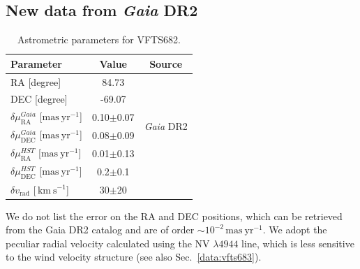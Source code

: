 \documentclass[a4paper,fleqn,usenatbib]{mnras}
\newcommand{\kms}{{\,\mathrm{km\ s^{-1}}}}
\DeclareRobustCommand{\Secref}[1]{Sec.~\ref{#1}}
\begin{document}
\subsection{New data from \emph{Gaia} DR2  \label{data:gaia}}

\begin{table}[t]
  \begin{center}
    \caption{Astrometric parameters for VFTS682. }
    \begin{tabular}{l|c|c}
      \hline
      \hline
      Parameter & Value & Source\\
      \hline
      RA \hfill[degree] &  \phantom{-}84.73 %
                        & \multirow{2}{*}{\cite{evans:11}}\\[5pt]
      DEC \hfill [degree] & -69.07 %
                        & \\[5pt]
      \hline
      $\delta\mu_\mathrm{RA}^{Gaia}$  \hfill[$\mathrm{mas\ yr^{-1}}$] & 0.10$\pm$0.07 & \multirow{2}{*}{\emph{Gaia} DR2}\\[5pt]
      $\delta\mu_\mathrm{DEC}^{Gaia}$  \hfill[$\mathrm{mas\ yr^{-1}}$] & 0.08$\pm$0.09 & \\[5pt]
      \hline
      $\delta\mu_\mathrm{RA}^{HST}$  \hfill[$\mathrm{mas\ yr^{-1}}$] & 0.01$\pm$0.13 & \multirow{2}{*}{\cite{platais:18}}\\[5pt]
      $\delta\mu_\mathrm{DEC}^{HST}$  \hfill[$\mathrm{mas\ yr^{-1}}$] &
                                                                        0.2$\pm$0.1 &
      \\[5pt]
      \hline
      $\delta v_\mathrm{rad}$  \hfill[$\kms$] & 30$\pm$20 & \cite{bestenlehner:11}\\
      \hline
    \end{tabular}
    {We do not list the error on the RA and DEC positions,
      which can be retrieved from the Gaia DR2 catalog and are of order
      $\sim$$10^{-2}\,\mathrm{mas\ yr^{-1}}$. We adopt the peculiar
      radial velocity calculated using the  NV $\lambda4944$ line, which is
      less sensitive to the wind velocity structure (see also \Secref{data:vfts683}).}
  \end{center}
  \label{tab:vfts682}
\end{table}
\end{document}

